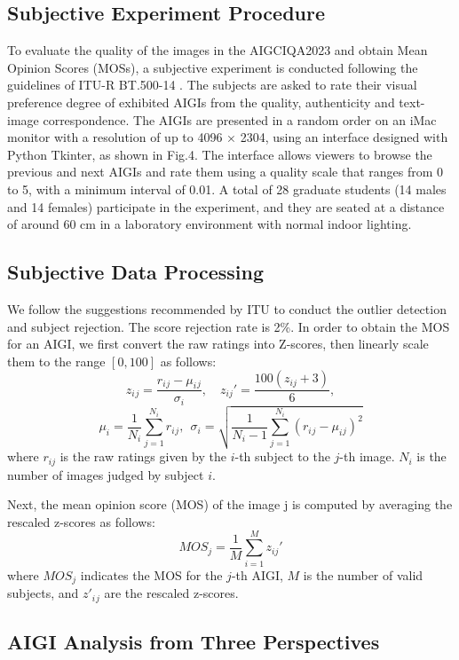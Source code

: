 \documentclass[runningheads]{llncs}
\begin{document}
\subsection{Subjective Experiment Procedure}
To evaluate the quality of the images in the AIGCIQA2023 and obtain Mean Opinion Scores (MOSs), a subjective experiment is conducted following the guidelines of ITU-R BT.500-14 \cite{duan2022confusing}. 
The subjects are asked to rate their visual preference degree of exhibited AIGIs from the quality, authenticity and text-image correspondence.
The AIGIs are presented in a random order on an iMac monitor with a resolution of up to 4096 × 2304, using an interface designed with Python Tkinter, as shown in Fig.4. The interface allows viewers to browse the previous and next AIGIs and rate them using a quality scale that ranges from 0 to 5, with a minimum interval of 0.01. A total of 28 graduate students (14 males and 14 females) participate in the experiment, and they are seated at a distance of around 60 cm in a laboratory  environment with normal indoor lighting.





\subsection{Subjective Data Processing}

We follow the suggestions recommended by ITU to conduct the outlier detection and subject rejection. 
The score rejection rate is 2\%.
In order to obtain the MOS for an AIGI, we first convert the raw ratings into Z-scores, then linearly scale them to the range $[0,100]$ as follows:
$$z_i{}_j=\frac{r_i{}_j-\mu_i{}_j}{\sigma_i},\quad z_{ij}'=\frac{100(z_{ij}+3)}{6},$$
$$\mu_i=\frac{1}{N_i}\sum_{j=1}^{N_i}r_i{}_j, ~~ \sigma_i=\sqrt{\frac{1}{N_i-1}\sum_{j=1}^{N_i}{(r_i{}_j-\mu_i{}_j)^2}}$$ 
where $r_{ij}$ is the raw ratings given by the $i$-th subject to the $j$-th image. $N_i$ is the number of images judged by subject $i$. 

Next, the mean opinion score (MOS) of the image j is computed by averaging the rescaled z-scores as follows:
$$MOS_j=\frac{1}{M}\sum_{i=1}^{M}z_{ij}'$$
where $MOS_j$ indicates the MOS for the $j$-th AIGI, $M$ is the number of valid subjects, and $z'_i{}_j$ are the rescaled z-scores. 


\subsection{AIGI Analysis from Three Perspectives}
\vspace{-2pt}
\end{document}
